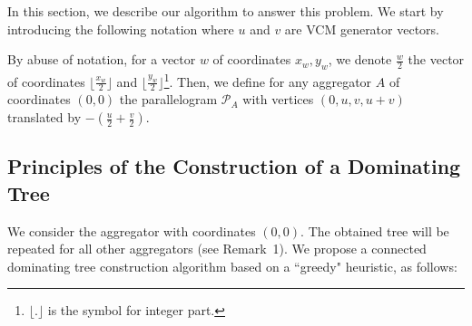 In this section, we describe our algorithm to answer this problem. 
We start by introducing the following notation where $u$ and $v$ are VCM generator vectors.
\begin{notation}
By abuse of notation, for a vector $w$ of coordinates $x_w,y_w$, we denote $\frac{w}{2}$ the vector of coordinates $\lfloor \frac{x_w}{2}\rfloor$ and $\lfloor \frac{y_w}{2}\rfloor$\footnote{$\lfloor . \rfloor$ is the symbol for integer part.}.
Then, we define for any aggregator $A$ of coordinates $(0,0)$  the parallelogram $\mathcal{P}_{A}$ with vertices $(0,u,v,u+v)$ translated by $-(\frac{u}{2}+\frac{v}{2})$. \end{notation}





\subsection{Principles of the Construction of a Dominating Tree}
We consider the aggregator with coordinates $(0,0)$. The obtained tree will be repeated for all other aggregators (see Remark~1). We propose a connected dominating tree construction algorithm based on a ``greedy" heuristic, as follows:

